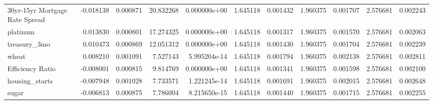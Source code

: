 \documentclass[12pt,a4paper,english]{article}
\begin{document}
{{\begin{tabular}{@{}lrrrrrrrrrr@{}}
			30yr-15yr Mortgage Rate Spread & -0.018138                & 0.000871                    & 20.832268                 & 0.000000e+00                 & 1.645118                      & 0.001432                      & 1.960375                     & 0.001707                     & 2.576681                     & 0.002243                     \\
			platinum                       & 0.013830                 & 0.000801                    & 17.274325                 & 0.000000e+00                 & 1.645118                      & 0.001317                      & 1.960375                     & 0.001570                     & 2.576681                     & 0.002063                     \\
			treasury\_3mo                  & 0.010473                 & 0.000869                    & 12.051312                 & 0.000000e+00                 & 1.645118                      & 0.001430                      & 1.960375                     & 0.001704                     & 2.576681                     & 0.002239                     \\
			wheat                          & 0.008210                 & 0.001091                    & 7.527143                  & 5.995204e-14                 & 1.645118                      & 0.001794                      & 1.960375                     & 0.002138                     & 2.576681                     & 0.002811                     \\
			Efficiency Ratio               & -0.008001                & 0.000815                    & 9.814769                  & 0.000000e+00                 & 1.645118                      & 0.001341                      & 1.960375                     & 0.001598                     & 2.576681                     & 0.002100                     \\
			housing\_starts                & -0.007948                & 0.001028                    & 7.733571                  & 1.221245e-14                 & 1.645118                      & 0.001691                      & 1.960375                     & 0.002015                     & 2.576681                     & 0.002648                     \\
			sugar                          & -0.006813                & 0.000875                    & 7.786004                  & 8.215650e-15                 & 1.645118                      & 0.001440                      & 1.960375                     & 0.001715                     & 2.576681                     & 0.002255                     \\

\end{tabular}}}
\end{document}
